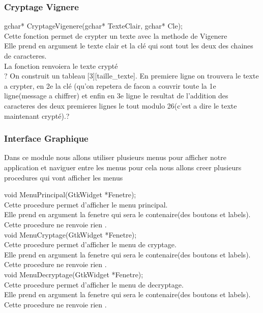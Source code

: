 \documentclass[a4]{article}
\begin{document}
		\subsubsection{Cryptage Vignere}
	gchar* CryptageVigenere(gchar* TexteClair, gchar* Cle);\\
		Cette fonction permet de crypter un texte avec la methode de Vigenere\\
		Elle prend en argument le texte clair et la clé qui sont tout les deux des chaines de caracteres.\\
		La fonction renvoiera le texte crypté\\
		? On construit un tableau [3][taille_texte]. En premiere ligne on trouvera le texte a crypter, en 2e la clé (qu'on repetera de facon a couvrir toute la 1e ligne(message a chiffrer) et enfin en 3e ligne le resultat de l'addition des caracteres des deux premieres lignes le tout modulo 26(c'est a dire le texte maintenant crypté).?
		
		\subsubsection{Interface Graphique}
		Dans ce module nous allons utiliser plusieurs menus pour afficher notre application et naviguer 
		entre les menus pour cela nous allons creer plusieurs procedures qui vont afficher les menus  

	void MenuPrincipal(GtkWidget *Fenetre);\\
		Cette procedure permet d'afficher le menu principal.\\
		Elle prend en argument la fenetre qui sera le contenaire(des boutons et labels).\\
		Cette procedure ne renvoie rien .\\
	
	void MenuCryptage(GtkWidget *Fenetre);\\
		Cette procedure permet d'afficher le menu de cryptage.\\
		Elle prend en argument la fenetre qui sera le contenaire(des boutons et labels).\\
		Cette procedure ne renvoie rien .\\
	
	void MenuDecryptage(GtkWidget *Fenetre);\\
		Cette procedure permet d'afficher le menu de decryptage.\\
		Elle prend en argument la fenetre qui sera le contenaire(des boutons et labels).\\
		Cette procedure ne renvoie rien .\\
	
\end{document}
